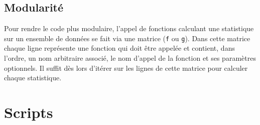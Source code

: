 \documentclass[a4paper, 12pt]{article}
\begin{document}
	\subsection{Modularité} \label{sec:Modularité}
	Pour rendre le code plus modulaire, l'appel de fonctions calculant une statistique sur un ensemble de données se fait via une matrice (\texttt{f} ou \texttt{g}). Dans cette matrice chaque ligne représente une fonction qui doit être appelée et contient, dans l'ordre, un nom arbitraire associé, le nom d'appel de la fonction et ses paramètres optionnels. Il suffit dès lors d'itérer sur les lignes de cette matrice pour calculer chaque statistique.
	\section{Scripts}
	
    
    
    
    
    
    
    
    
    
    
    
    
    
    
    
    
    
    
    
    
    \newpage
\end{document}
